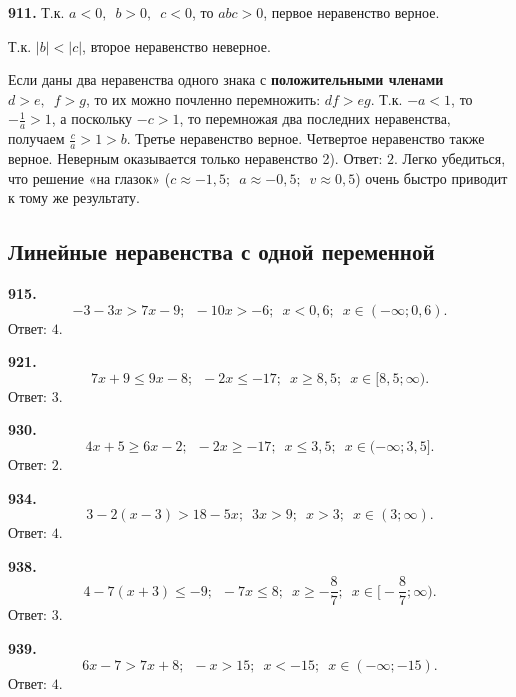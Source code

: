 \textbf{911.} Т.к. $a<0,\enspace b>0,\enspace c<0$, то $abc>0$, первое неравенство верное. 

Т.к. $|b|<|c|$, второе неравенство неверное. 

Если даны два неравенства одного знака с \textbf{положительными членами} $d>e,\enspace f>g$, то их можно почленно перемножить: $df>eg$. Т.к. $-a<1$, то $-\frac{1}{a}>1$, а поскольку $-c>1$, то перемножая два последних неравенства, получаем  $\frac{c}{a}>1>b$. Третье неравенство верное. Четвертое неравенство также верное. Неверным оказывается только неравенство 2). \newline \null \hspace*{\fill} Ответ: $2$.
Легко убедиться, что решение «на глазок» ($c\approx-1,5;\enspace a\approx-0,5;\enspace v\approx0,5$) очень быстро приводит к тому же результату.


\subsection{Линейные неравенства с одной переменной}

\textbf{915.} $$-3-3x>7x-9;\enspace -10x>-6;\enspace x<0,6;\enspace x\in(-\infty;0,6).$$ \newline \null \hspace*{\fill} Ответ: $4$. 

\textbf{921.} $$7x+9\leq9x-8;\enspace -2x\leq-17;\enspace x\geq8,5;\enspace x\in[8,5;\infty).$$ \newline \null \hspace*{\fill} Ответ: $3$. 

\textbf{930.} $$4x+5\geq6x-2;\enspace-2x\geq-17;\enspace x\leq3,5;\enspace x\in(-\infty;3,5].$$ \newline \null \hspace*{\fill} Ответ: $2$. 

\textbf{934.} $$3-2(x-3)>18-5x;\enspace 3x>9;\enspace x>3;\enspace x\in(3;\infty).$$ \newline \null \hspace*{\fill} Ответ: $4$.

\textbf{938.} $$4-7(x+3)\leq-9;\enspace -7x\leq8;\enspace x\geq-\frac{8}{7};\enspace x\in\bigg[-\frac{8}{7};\infty\bigg).$$ \newline \null \hspace*{\fill} Ответ: $3$. 

\textbf{939.} $$6x-7>7x+8;\enspace -x>15;\enspace x<-15;\enspace x\in(-\infty;-15).$$ \newline \null \hspace*{\fill} Ответ: $4$.

